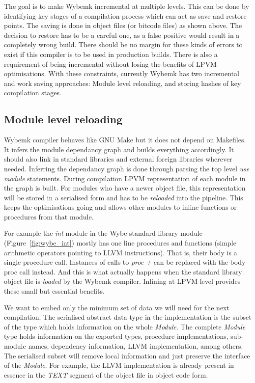 The goal is to make Wybemk incremental at multiple levels. This can be done by
identifying key stages of a compilation process which can act as save and
restore points. The saving is done in object files (or bitcode files) as shown
above. The decision to restore has to be a careful one, as a false positive
would result in a completely wrong build. There should be no margin for these
kinds of errors to exist if this compiler is to be used in production
builds. There is also a requirement of being incremental without losing the
benefits of LPVM optimisations. With these constraints, currently Wybemk has
two incremental and work saving approaches: Module level reloading, and storing
hashes of key compilation stages.


\subsection{Module level reloading}

Wybemk compiler behaves like GNU Make but it does not depend on Makefiles. It
infers the module dependancy graph and builds everything accordingly. It should
also link in standard libraries and external foreign libraries wherever
needed. Inferring the dependancy graph is done through parsing the top level
\textit{use module} statements. During compilation LPVM representation of each
module in the graph is built. For modules who have a newer object file, this
representation will be stored in a serialised form and has to be
\textit{reloaded} into the pipeline. This keeps the optimisations going and
allows other modules to inline functions or procedures from that module.

For example the \textit{int} module in the Wybe standard library module
(Figure~\ref{fig:wybe_int}) mostly has one line procedures and functions
(simple arithmetic operators pointing to LLVM instructions). That is, their
body is a single procedure call. Instances of calls to \textit{proc +} can be
replaced with the body proc call instead. And this is what actually happens
when the standard library object file is \textit{loaded} by the Wybemk
compiler. Inlining at LPVM level provides these small but essential benefits.

We want to embed only the minimum set of data we will need for the next
compilation. The serialised abstract data type in the implementation is the
subset of the type which holds information on the whole \textit{Module}. The
complete \textit{Module} type holds information on the exported types,
procedure implementations, sub-module names, dependency information, LLVM
implementation, among others. The serialised subset will remove local
information and just preserve the interface of the \textit{Module}. For
example, the LLVM implementation is already present in essence in the
\textit{TEXT} segment of the object file in object code form.

